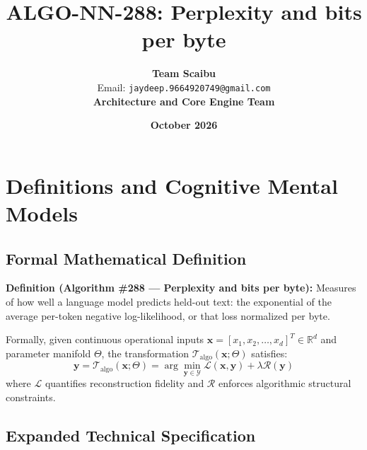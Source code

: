 \documentclass[11pt,a4paper]{article}
\title{\textbf{ALGO-NN-288: Perplexity and bits per byte}}
\author{\textbf{Team Scaibu} \\ \small Email: \texttt{jaydeep.9664920749@gmail.com} \\ \small \textbf{Architecture and Core Engine Team}}
\date{\textbf{October 2026}}
\theoremstyle{definition}
\begin{document}
\maketitle

\section{Definitions and Cognitive Mental Models}

\subsection{Formal Mathematical Definition}
\textbf{Definition (Algorithm \#288 --- Perplexity and bits per byte):}
Measures of how well a language model predicts held-out text: the exponential of the average per-token negative log-likelihood, or that loss normalized per byte.

Formally, given continuous operational inputs $\mathbf{x} = [x_1, x_2, \dots, x_d]^T \in \mathbb{R}^d$ and parameter manifold $\Theta$, the transformation $\mathcal{T}_{\text{algo}}(\mathbf{x}; \Theta)$ satisfies:
{\boldmath
\begin{equation}
\mathbf{y} = \mathcal{T}_{\text{algo}}(\mathbf{x}; \Theta) = \arg\min_{\mathbf{y} \in \mathcal{Y}} \mathcal{L}(\mathbf{x}, \mathbf{y}) + \lambda \mathcal{R}(\mathbf{y})
\end{equation}
}
where $\mathcal{L}$ quantifies reconstruction fidelity and $\mathcal{R}$ enforces algorithmic structural constraints.

\subsection{Expanded Technical Specification}
\end{document}
